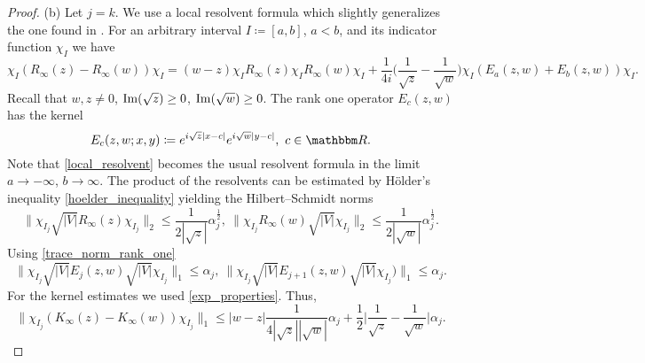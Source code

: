 \begin{proof}
(b)
Let $j=k$. We use a local resolvent formula which slightly generalizes the one found in \cite[(7.1),(7.2)]{Froese1997}.
For an arbitrary interval $I\coloneqq [a,b]$, $a<b$, and its indicator function $\chi_I$ we have 
\begin{equation}\label{local_resolvent}
  \chi_I ( R_\infty(z) - R_\infty(w) )\chi_I
     = (w-z) \chi_I R_\infty(z)\chi_I R_\infty(w)\chi_I
       + \frac{1}{4i} \big( \frac{1}{\sqrt{z}}-\frac{1}{\sqrt{w}} \big)                    
               \chi_I ( E_a(z,w) + E_b(z,w) )\chi_I .
\end{equation}
Recall that $w,z\neq 0$, $\operatorname{Im}(\sqrt{z})\geq 0$, $\operatorname{Im}(\sqrt{w})\geq 0$.
The rank one operator $E_c(z,w)$ has the kernel
\begin{equation*}
  E_c(z,w;x,y) \coloneqq e^{i\sqrt{z}|x-c|}e^{i\sqrt{w}|y-c|},\ c\in\R .
\end{equation*}
Note that \eqref{local_resolvent} becomes the usual resolvent formula in the limit $a\to-\infty$, $b\to\infty$.
The product of the resolvents can be estimated by H\"older's inequality \eqref{hoelder_inequality} yielding the
Hilbert--Schmidt norms
\begin{equation*}
  \|\chi_{I_j}\sqrt{|V|}R_\infty(z)\chi_{I_j}\|_2 \leq \frac{1}{2|\sqrt{z}|} \alpha_j^{\frac{1}{2}},\
  \|\chi_{I_j}R_\infty(w)\sqrt{|V|}\chi_{I_j}\|_2 \leq \frac{1}{2|\sqrt{w}|} \alpha_j^{\frac{1}{2}} .
\end{equation*}
Using \eqref{trace_norm_rank_one}
\begin{equation*}
  \| \chi_{I_j} \sqrt{|V|}E_j(z,w)\sqrt{|V|}\chi_{I_j} \|_1 \leq \alpha_j,\   
  \| \chi_{I_j} \sqrt{|V|}E_{j+1}(z,w)\sqrt{|V|}\chi_{I_j}) \|_1 \leq \alpha_j  .
\end{equation*}
For the kernel estimates we used \eqref{exp_properties}. Thus,
\begin{equation*}
  \| \chi_{I_j}( K_\infty(z) - K_\infty(w) )\chi_{I_j}\|_1 
     \leq |w-z| \frac{1}{4|\sqrt{z}||\sqrt{w}|} \alpha_j + \frac{1}{2} \Big| \frac{1}{\sqrt{z}}-\frac{1}{\sqrt{w}}\Big| \alpha_j .
\end{equation*}


\end{proof}
